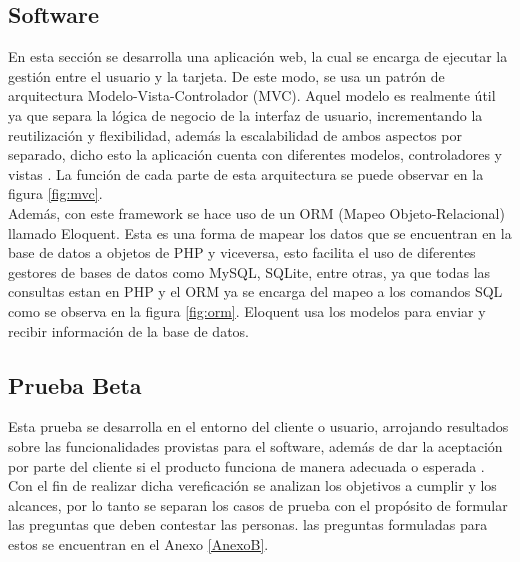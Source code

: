 
\subsection{Software}

En esta sección se desarrolla una aplicación web, la cual se encarga de ejecutar la gestión entre el usuario y la tarjeta. De este modo, se usa un patrón de arquitectura Modelo-Vista-Controlador (MVC). Aquel modelo es realmente útil ya que separa la lógica de negocio de la interfaz de usuario, incrementando la reutilización y flexibilidad, además la escalabilidad de ambos aspectos por separado, dicho esto la aplicación cuenta con diferentes modelos, controladores y vistas \cite{MVC1}. La función de cada parte de esta arquitectura se puede observar en la figura \ref{fig:mvc}.\\


Además, con este framework se hace uso de un ORM (Mapeo Objeto-Relacional) llamado Eloquent. Esta es una forma de mapear los datos que se encuentran en la base de datos a objetos de PHP y viceversa, esto facilita el uso de diferentes gestores de bases de datos como MySQL, SQLite, entre otras, ya que todas las consultas estan en PHP y el ORM ya se encarga del mapeo a los comandos SQL como se observa en la figura \ref{fig:orm}. Eloquent usa los modelos para enviar y recibir información de la base de datos\cite{Eloq}.


\subsection{Prueba Beta}

Esta prueba se desarrolla en el entorno del cliente o usuario, arrojando resultados sobre las funcionalidades provistas para el software, además de dar la aceptación por parte del cliente si el producto funciona de manera adecuada o esperada \cite{PB}. Con el fin de realizar dicha vereficación se analizan los objetivos a cumplir y los alcances, por lo tanto se separan los casos de prueba con el propósito de formular las preguntas que deben contestar las personas. las preguntas formuladas para estos se encuentran en el Anexo \ref{AnexoB}.\\

